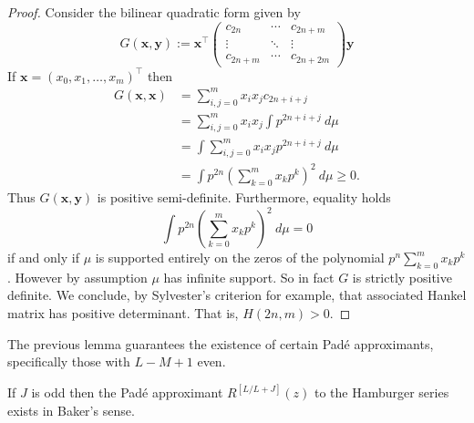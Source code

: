 \begin{proof}
  
  Consider the bilinear quadratic form given by
  \[
    G(\mathbf{x}, \mathbf{y}) :=
    \mathbf{x}^\top
    \begin{pmatrix}
      c_{2n} & \cdots & c_{2n+m} \\
      \vdots & \ddots & \vdots  \\
      c_{2n+m} & \cdots & c_{2n+2m}
    \end{pmatrix}
    \mathbf{y}
  \]
  If $\mathbf{x} = {(x_0, x_1, \ldots, x_m)}^\top$ then
  \begin{align*}
    G(\mathbf{x}, \mathbf{x})
    &= \sum_{i,j=0}^m x_i x_j c_{2n+i+j} \\
    &= \sum_{i,j=0}^m x_i x_j \int p^{2n+i+j} ~d\mu \\
    &= \int \sum_{i,j=0}^m x_i x_j p^{2n+i+j} ~d\mu \\
    &= \int p^{2n} {\left(\sum_{k=0}^m x_k p^{k}\right)}^2 ~d\mu 
    \geq 0.
  \end{align*}
  Thus $G(\mathbf{x}, \mathbf{y})$ is positive semi-definite. Furthermore, equality holds
  \[
    \int p^{2n}{\left(\sum_{k=0}^m x_k p^{k}\right)}^2 ~d\mu = 0
  \]
  if and only if $\mu$ is supported entirely on the zeros of the polynomial $p^n\sum_{k=0}^m x_k p^{k}$. However by assumption $\mu$ has infinite support. So in fact $G$ is strictly positive definite. We conclude, by Sylvester's criterion for example, that associated Hankel matrix has positive determinant. That is, $H(2n, m) > 0$.
\end{proof}

The previous lemma guarantees the existence of certain Pad\'e approximants, specifically those with $L-M+1$ even. 
\begin{proposition}
  If $J$ is odd then the Pad\'e approximant $R^{[L/L+J]}(z)$ to the Hamburger series exists in Baker's sense.
\end{proposition}


